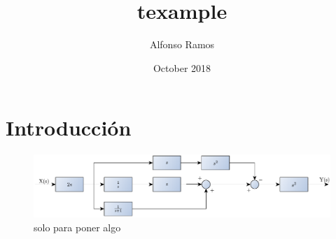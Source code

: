 \documentclass{article}
\title{texample}
\author{Alfonso Ramos}
\date{October 2018}
\begin{document}
\maketitle

\section{Introducción}
\lipsum[1-5]
\begin{figure}
	\centering
	\includegraphics[width=0.7\linewidth]{img/fig1}
	\caption{solo para poner algo}
	\label{fig:fig1}
\end{figure}
\end{document}
